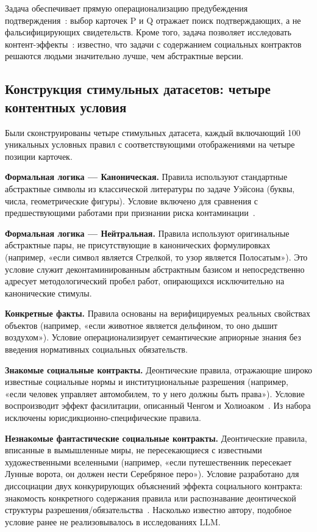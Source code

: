 Задача обеспечивает прямую операционализацию предубеждения подтверждения~\cite{nickerson1998confirmation}: выбор карточек P и Q отражает поиск подтверждающих, а не фальсифицирующих свидетельств. Кроме того, задача позволяет исследовать контент-эффекты~\cite{cheng1985pragmatic, cosmides1992cognitive}: известно, что задачи с содержанием социальных контрактов решаются людьми значительно лучше, чем абстрактные версии.

\subsection{Конструкция стимульных датасетов: четыре контентных условия}

Были сконструированы четыре стимульных датасета, каждый включающий 100 уникальных условных правил с соответствующими отображениями на четыре позиции карточек.

\textbf{Формальная логика --- Каноническая.} Правила используют стандартные абстрактные символы из классической литературы по задаче Уэйсона (буквы, числа, геометрические фигуры). Условие включено для сравнения с предшествующими работами при признании риска контаминации~\cite{binz2023using, arkoudas2023gpt4}.

\textbf{Формальная логика --- Нейтральная.} Правила используют оригинальные абстрактные пары, не присутствующие в канонических формулировках (например, «если символ является Стрелкой, то узор является Полосатым»). Это условие служит деконтаминированным абстрактным базисом и непосредственно адресует методологический пробел работ, опирающихся исключительно на канонические стимулы.

\textbf{Конкретные факты.} Правила основаны на верифицируемых реальных свойствах объектов (например, «если животное является дельфином, то оно дышит воздухом»). Условие операционализирует семантические априорные знания без введения нормативных социальных обязательств.

\textbf{Знакомые социальные контракты.} Деонтические правила, отражающие широко известные социальные нормы и институциональные разрешения (например, «если человек управляет автомобилем, то у него должны быть права»). Условие воспроизводит эффект фасилитации, описанный Ченгом и Холиоаком~\cite{cheng1985pragmatic}. Из набора исключены юрисдикционно-специфические правила.

\textbf{Незнакомые фантастические социальные контракты.} Деонтические правила, вписанные в вымышленные миры, не пересекающиеся с известными художественными вселенными (например, «если путешественник пересекает Лунные ворота, он должен нести Серебряное перо»). Условие разработано для диссоциации двух конкурирующих объяснений эффекта социального контракта: знакомость конкретного содержания правила или распознавание деонтической структуры разрешения/обязательства~\cite{cheng1985pragmatic, cosmides1992cognitive}. Насколько известно автору, подобное условие ранее не реализовывалось в исследованиях LLM.

